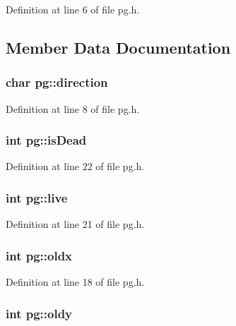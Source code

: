 Definition at line 6 of file pg.\-h.



\subsection{Member Data Documentation}
\hypertarget{structpg_a316ca3ecda285dccada164e82e24ea87}{
\subsubsection[{direction}]{\setlength{\rightskip}{0pt plus 5cm}char pg\-::direction}}\label{structpg_a316ca3ecda285dccada164e82e24ea87}


Definition at line 8 of file pg.\-h.

\hypertarget{structpg_a45f051274aa5b8afd7880d502398c704}{
\subsubsection[{is\-Dead}]{\setlength{\rightskip}{0pt plus 5cm}int pg\-::is\-Dead}}\label{structpg_a45f051274aa5b8afd7880d502398c704}


Definition at line 22 of file pg.\-h.

\hypertarget{structpg_a4b8d3a6539dc40849f385521deff7b8e}{
\subsubsection[{live}]{\setlength{\rightskip}{0pt plus 5cm}int pg\-::live}}\label{structpg_a4b8d3a6539dc40849f385521deff7b8e}


Definition at line 21 of file pg.\-h.

\hypertarget{structpg_aefa92faaea6ca845fab464254844d3d0}{
\subsubsection[{oldx}]{\setlength{\rightskip}{0pt plus 5cm}int pg\-::oldx}}\label{structpg_aefa92faaea6ca845fab464254844d3d0}


Definition at line 18 of file pg.\-h.

\hypertarget{structpg_a3ef8ab3103efcd9f742da765501685a3}{
\subsubsection[{oldy}]{\setlength{\rightskip}{0pt plus 5cm}int pg\-::oldy}}\label{structpg_a3ef8ab3103efcd9f742da765501685a3}


